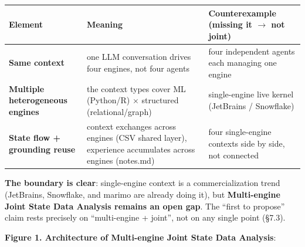 \documentclass[11pt]{article}
\begin{document}
{\small
\begin{tabular}{@{}
  >{\raggedright\arraybackslash}p{}
  >{\raggedright\arraybackslash}p{}
  >{\raggedright\arraybackslash}p{}@{}}
\toprule
Element & Meaning & Counterexample (missing it $\rightarrow$ not joint) \\
\midrule
\textbf{Same context} & one LLM conversation drives four engines, not four agents & four independent agents each managing one engine \\
\textbf{Multiple heterogeneous engines} & the context types cover ML (Python/R) $\times$ structured (relational/graph) & single-engine live kernel (JetBrains / Snowflake) \\
\textbf{State flow + grounding reuse} & context exchanges across engines (CSV shared layer), experience accumulates across engines (notes.md) & four single-engine contexts side by side, not connected \\
\bottomrule
\end{tabular}}

\textbf{The boundary is clear}: single-engine context is a commercialization trend (JetBrains, Snowflake, and marimo are already doing it), but \textbf{Multi-engine Joint State Data Analysis remains an open gap}. The ``first to propose'' claim rests precisely on ``multi-engine + joint'', not on any single point (\S{}7.3).

\textbf{Figure 1. Architecture of Multi-engine Joint State Data Analysis}:
\end{document}
